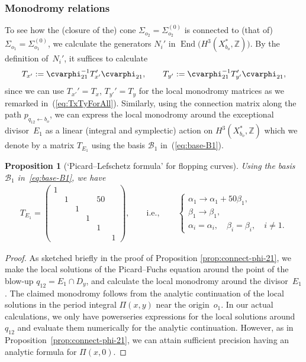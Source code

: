 \documentclass[pdftex]{sigma}
\numberwithin{equation}{section}
\newtheorem{Proposition}[Theorem]{Proposition}
\begin{document}
\subsubsection{Monodromy relations}
To see how the (closure of the) cone $\Sigma_{o_{2}}=\Sigma_{o_{2}}^{(0)}$ is connected to (that of) $\Sigma_{o_{1}}=\Sigma_{o_{1}}^{(0)}$, we calculate the generators $N_{i}'$ in $\operatorname{End}\big(H^{3}(X_{b_{o}}^{*},\mathbb{Z})\big)$. By the definition of~$N_{i}'$, it suffices to calculate
\begin{gather*}
T_{x'}:=\cvarphi_{21}^{-1} T_{x'}^{\prime} \cvarphi_{21},\qquad T_{y'}:=\cvarphi_{21}^{-1} T_{y'}^{\prime} \cvarphi_{21},
\end{gather*}
since we can use $T_{x'}'=T_{x}$, $T_{y'}'=T_{y}$ for the local monodromy matrices as we remarked in~(\ref{eq:TxTyForAll}). Similarly, using the connection matrix along the path $p_{q_{12}\leftarrow b_{o}}$, we can express the local monodromy around the exceptional divisor~$E_{1}$ as a linear (integral and symplectic) action on $H^{3}(X_{b_{o}}^{*},\mathbb{Z})$ which we denote by a matrix $T_{E_{1}}$ using the basis $\mathcal{B}_{1}$ in~(\ref{eq:base-B1}).
\begin{Proposition}[`Picard--Lefschetz formula' for flopping curves] \label{prop:Picard-Lefschetz-Reye}Using the basis $\mathcal{B}_{1}$ in~\eqref{eq:base-B1}, we have
\begin{gather*}
T_{E_{1}}=\left(\begin{smallmatrix}1\\
 & 1 & & & 50\\
 & & 1\\
 & & & 1\\
 & & & & 1\\
 & & & & & 1
\end{smallmatrix}\right), \qquad \text{i.e.}, \qquad \begin{cases}
\alpha_{1}\to\alpha_{1}+50\beta_{1},\\
\beta_{1}\to\beta_{1},\\
\alpha_{i}=\alpha_{i},\quad \beta_{i}=\beta_{i},\quad i\not=1.
\end{cases}%
\end{gather*}
\end{Proposition}
\begin{proof}As sketched briefly in the proof of Proposition \ref{prop:connect-phi-21}, we make the local solutions of the Picard--Fuchs equation around the point of the blow-up $q_{12}=E_{1}\cap D_{y}$, and calculate the local monodromy around the divisor~$E_{1}$. The claimed monodromy
follows from the analytic continuation of the local solutions in the period integral $\Pi(x,y)$ near the origin~$o_{1}$. In our actual calculations, we only have powerseries expressions for the local solutions around $q_{12}$ and evaluate them numerically for the analytic continuation. However, as in Proposition~\ref{prop:connect-phi-21}, we can attain sufficient precision having an analytic formula for $\Pi(x,0)$. \end{proof}
\end{document}
